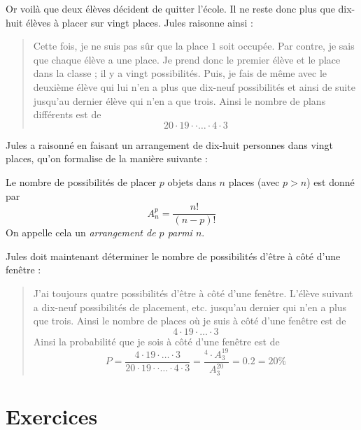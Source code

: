 Or voilà que deux élèves décident de quitter l'école. Il ne reste donc plus que dix-huit élèves à placer sur vingt places. Jules raisonne ainsi :
\begin{quote}
Cette fois, je ne suis pas sûr que la place $1$ soit occupée. Par contre, je sais que chaque élève a une place. Je prend donc le premier élève et le place dans la classe ; il y a vingt possibilités. Puis, je fais de même avec le deuxième élève qui lui n'en a plus que dix-neuf possibilités et ainsi de suite jusqu'au dernier élève qui n'en a que trois. Ainsi le nombre de plans différents est de 
$$
20\cdot 19 \cdot \cdot \dots \cdot 4 \cdot 3
$$
\end{quote}
Jules a raisonné en faisant un arrangement de dix-huit personnes dans vingt places, qu'on formalise de la manière suivante :
\begin{definition}
Le nombre de possibilités de placer $p$ objets dans $n$ places (avec $p>n$) est donné par 
$$
A^p_n = \frac{n!}{(n-p)!}
$$
On appelle cela un \emph{arrangement de $p$ parmi $n$}.
\end{definition}

Jules doit maintenant déterminer le nombre de possibilités d'être à côté d'une fenêtre :
\begin{quote}
J'ai toujours quatre possibilités d'être à côté d'une fenêtre. L'élève suivant a dix-neuf possibilités de placement, etc. jusqu'au dernier qui n'en a plus que trois. Ainsi le nombre de places où je suis à côté d'une fenêtre est de 
$$
4\cdot 19 \cdot \dots \cdot 3
$$
Ainsi la probabilité que je sois à côté d'une fenêtre est de 
$$
P = \frac{4\cdot 19 \cdot \dots \cdot 3}{20\cdot 19 \cdot \cdot \dots \cdot 4 \cdot 3} = \frac{^4\cdot A^{19}_3}{A^{20}_3} = 0.2 = 20 \%
$$
\end{quote}

\section{Exercices}

